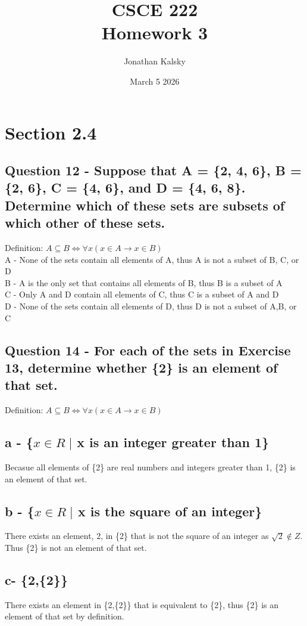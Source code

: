 \documentclass{article}
\author{Jonathan Kalsky}
\date{March 5 2026}
\title{\normalsize CSCE 222\\ \Large Homework 3}
\begin{document}
\maketitle
\tableofcontents
\vspace{1cm}
\section{Section 2.4}
\subsection{Question 12 - Suppose that A = \{2, 4, 6\}, B = \{2, 6\}, C = \{4, 6\}, and
D = \{4, 6, 8\}. Determine which of these sets are subsets
of which other of these sets.}
Definition: $A \subseteq B \iff \forall x (x \in A \to x \in B)$\\
A - None of the sets contain all elements of A, thus A is not a subset of B, C, or D\\
B - A is the only set that contains all elements of B, thus B is a subset of A\\
C - Only A and D contain all elements of C, thus C is a subset of A and D\\
D - None of the sets contain all elements of D, thus D is not a subset of A,B, or C
\subsection{Question 14 - For each of the sets in Exercise 13, determine whether
\{2\} is an element of that set.}
Definition: $A \subseteq B \iff \forall x (x \in A \to x \in B)$\\
\subsection[a]{a - \{$x \in R \; \vert $ x is an integer greater than 1\}}
Becasue all elements of \{2\} are real numbers and integers greater than 1, \{2\} is an element of that set.
\subsection[b]{b - \{$x \in R \; \vert $ x is the square of an integer\}}
There exists an element, 2, in \{2\} that is not the square of an integer as $\sqrt{2} \notin Z$. Thus \{2\} is not an element of that set.
\subsection[c]{c- \{2,\{2\}\}}
There exists an element in \{2,\{2\}\} that is equivalent to \{2\}, thus \{2\} is an element of that set by definition.
\end{document}
